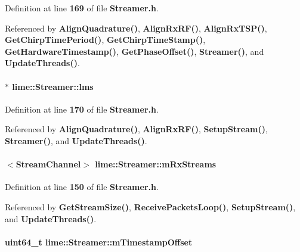 Definition at line {\bf 169} of file {\bf Streamer.\+h}.



Referenced by {\bf Align\+Quadrature()}, {\bf Align\+Rx\+R\+F()}, {\bf Align\+Rx\+T\+S\+P()}, {\bf Get\+Chirp\+Time\+Period()}, {\bf Get\+Chirp\+Time\+Stamp()}, {\bf Get\+Hardware\+Timestamp()}, {\bf Get\+Phase\+Offset()}, {\bf Streamer()}, and {\bf Update\+Threads()}.

\paragraph[{lms}]{$\ast$ lime\+::\+Streamer\+::lms\hspace{0.3cm}{\ttfamily [private]}}\label{classlime_1_1Streamer_acccfcc9efdf3f4b3df92860e8daa92cb}


Definition at line {\bf 170} of file {\bf Streamer.\+h}.



Referenced by {\bf Align\+Quadrature()}, {\bf Align\+Rx\+R\+F()}, {\bf Setup\+Stream()}, {\bf Streamer()}, and {\bf Update\+Threads()}.

\paragraph[{m\+Rx\+Streams}]{$<${\bf Stream\+Channel}$>$ lime\+::\+Streamer\+::m\+Rx\+Streams}\label{classlime_1_1Streamer_a9f1b1c40c42bc8a02dfde53d9596cd96}


Definition at line {\bf 150} of file {\bf Streamer.\+h}.



Referenced by {\bf Get\+Stream\+Size()}, {\bf Receive\+Packets\+Loop()}, {\bf Setup\+Stream()}, and {\bf Update\+Threads()}.

\paragraph[{m\+Timestamp\+Offset}]{\setlength{\rightskip}{0pt plus 5cm}uint64\+\_\+t lime\+::\+Streamer\+::m\+Timestamp\+Offset}\label{classlime_1_1Streamer_a8c3e9262ec599581a75dc12bc3e45583}


